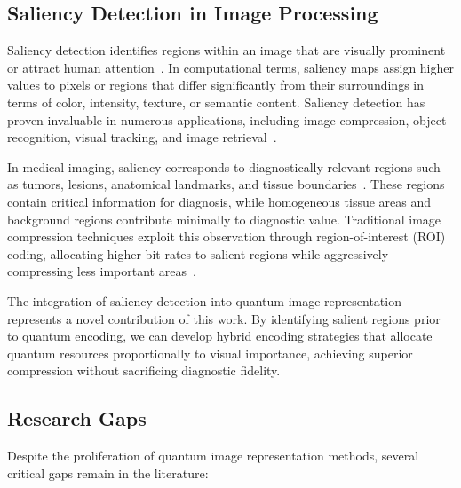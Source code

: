 \documentclass{ipol}
\begin{document}
\subsection{Saliency Detection in Image Processing}

Saliency detection identifies regions within an image that are visually prominent or attract human attention~\cite{bib26,bib27,bib28,bib29,bib30,bib31}. In computational terms, saliency maps assign higher values to pixels or regions that differ significantly from their surroundings in terms of color, intensity, texture, or semantic content. Saliency detection has proven invaluable in numerous applications, including image compression, object recognition, visual tracking, and image retrieval~\cite{bib32,bib33,bib34,bib35}.

In medical imaging, saliency corresponds to diagnostically relevant regions such as tumors, lesions, anatomical landmarks, and tissue boundaries~\cite{bib36,bib37,bib38,bib39,bib40}. These regions contain critical information for diagnosis, while homogeneous tissue areas and background regions contribute minimally to diagnostic value. Traditional image compression techniques exploit this observation through region-of-interest (ROI) coding, allocating higher bit rates to salient regions while aggressively compressing less important areas~\cite{bib41}.

The integration of saliency detection into quantum image representation represents a novel contribution of this work. By identifying salient regions prior to quantum encoding, we can develop hybrid encoding strategies that allocate quantum resources proportionally to visual importance, achieving superior compression without sacrificing diagnostic fidelity.

\subsection{Research Gaps}

Despite the proliferation of quantum image representation methods, several critical gaps remain in the literature:
\end{document}
